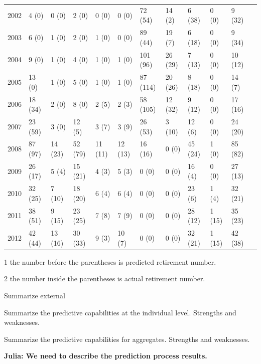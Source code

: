 \documentclass[12pt,letterpaper]{article}
\begin{document}
\begin{table}[h!]
\begin{threeparttable}
\begin{tabular}{clllllllllll}
			2002  & 4 (0) & 0 (0) & 2 (0) & 0 (0) & 0 (0) & 72 (54) & 14 (2) & 6 (38) & 0 (0) & 9 (32) \\
			2003  & 6 (0) & 1 (0) & 2 (0) & 1 (0) & 0 (0) & 89 (44) & 19 (7) & 6 (18) & 0 (0) & 9 (34) \\
			2004  & 9 (0) & 1 (0) & 4 (0) & 1 (0) & 1 (0) & 101 (96) & 26 (29) & 7 (13) & 0 (0) & 10 (12) \\
			2005  & 13 (0) & 1 (0) & 5 (0) & 1 (0) & 1 (0) & 87 (114) & 20 (26) & 8 (18) & 0 (0) & 14 (7) \\
			2006  & 18 (34) & 2 (0) & 8 (0) & 2 (5) & 2 (3) & 58 (105) & 12 (32) & 9 (12) & 0 (0) & 17 (16) \\
			2007  & 23 (59) & 3 (0) & 12 (5) & 3 (7) & 3 (9) & 26 (53) & 3 (10) & 12 (6) & 0 (0) & 24 (20) \\
			2008  & 87 (97) & 14 (23) & 52 (79) & 11 (11) & 12 (13) & 16 (16) & 0 (0) & 45 (24) & 1 (0) & 85 (82) \\
			2009  & 26 (17) & 5 (4) & 15 (21) & 4 (3) & 5 (3) & 0 (0) & 0 (0) & 16 (4) & 0 (0) & 27 (13) \\
			2010  & 32 (25) & 7 (10) & 18 (20) & 6 (4) & 6 (4) & 0 (0) & 0 (0) & 23 (6) & 1 (4) & 32 (21) \\
			2011  & 38 (51) & 9 (15) & 23 (25) & 7 (8) & 7 (9) & 0 (0) & 0 (0) & 28 (12) & 1 (15) & 35 (23) \\
			2012  & 42 (44) & 13 (16) & 30 (33) & 9 (3) & 10 (7) & 0 (0) & 0 (0) & 32 (21) & 1 (15) & 42 (38) \\
			
			
			\bottomrule
		\end{tabular}%
		\begin{tablenotes}
			\item[1] the number before the parentheses is predicted retirement number.
			\item[2] the number inside the parentheses is actual retirement number.
		\end{tablenotes}
	\end{threeparttable}
	\label{tab:division}%
\end{table}%

Summarize external

Summarize the predictive capabilities at the individual level.  Strengths and weaknesses.

Summarize the predictive capabilities for aggregates.  Strengths and weaknesses.

{\bf Julia: We need to describe the prediction process results.}
\end{document}
